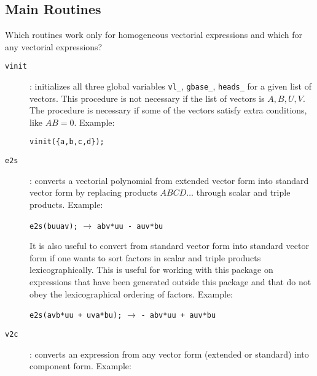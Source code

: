 \subsection{Main Routines}

Which routines work only for homogeneous vectorial expressions and
which for any vectorial expressions?
\begin{description}
\item[\texttt{vinit}] : initializes all three global variables
  \texttt{vl\_}, \texttt{gbase\_}, \texttt{heads\_} for a given list
  of vectors.  This procedure is not necessary if the list of vectors
  is $A,B,U,V$.  The procedure is necessary if some of the vectors
  satisfy extra conditions, like $\mathit{AB}=0$.  Example:

  \verb|vinit({a,b,c,d});|

\item[\texttt{e2s}] : converts a vectorial polynomial from extended
  vector form into standard vector form by replacing products
  $\mathit{ABCD}\ldots$ through scalar and triple products.  Example:

  \verb|e2s(buuav);| \quad $\longrightarrow$ \quad \verb|abv*uu - auv*bu|

  It is also useful to convert from standard vector form into standard
  vector form if one wants to sort factors in scalar and triple
  products lexicographically.  This is useful for working with this
  package on expressions that have been generated outside this package
  and that do not obey the lexicographical ordering of factors.
  Example:

  \verb|e2s(avb*uu + uva*bu);| \quad $\longrightarrow$ \quad
  \verb|- abv*uu + auv*bu|

\item[\texttt{v2c}] : converts an expression from any vector form
  (extended or standard) into component form. Example:


\end{description}
